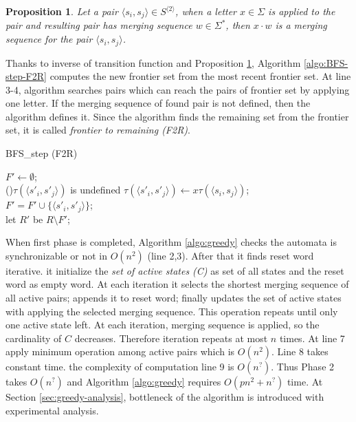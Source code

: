 \documentclass[12pt]{article}
\newtheorem{proposition}{Proposition}[section]
\begin{document}
\begin{proposition}
	\label{prop:merging}
	Let a pair $\langle s_i,s_j \rangle \in S^{\langle 2 \rangle}$, when a letter $x \in \Sigma$ is applied to the pair and resulting pair has merging sequence $w \in \Sigma^*$, then $x \cdot w$ is a merging sequence for the pair $\langle s_i,s_j \rangle$.
\end{proposition}

Thanks to inverse of transition function and Proposition \ref{prop:merging}, Algorithm \ref{algo:BFS-step-F2R} computes the new frontier set from the most recent frontier set. At line 3-4, algorithm searches pairs which can reach the pairs of frontier set by applying one letter. If the merging sequence of found pair is not defined, then the algorithm defines it. Since the algorithm finds the remaining set from the frontier set, it is called \textit{frontier to remaining (F2R)}. 

\begin{algorithm}[ht]
	\label{algo:BFS-step-F2R}
	\caption{{BFS\_step (F2R)}}
	
	
	$F' \longleftarrow \emptyset$;\\
	{
		{
			{
				\If(){$\tau(\langle s'_i,s'_j\rangle)$ is undefined}
				{
					$\tau(\langle s'_i,s'_j\rangle) \longleftarrow x \tau(\langle s_i,s_j \rangle)$;\\
					$F' = F' \cup \{ \langle s'_i,s'_j\rangle  \} $;\\
				}
			}
		}
	}
	let $R'$ be $R \setminus F'$;
\end{algorithm}

When first phase is completed, Algorithm \ref{algo:greedy} checks the automata is synchronizable or not in $O(n^2)$ (line 2,3). After that it finds reset word iterative. it initialize the \textit{set of active states (C)} as set of all states and the reset word as empty word. At each iteration it selects the shortest merging sequence of all active pairs; appends it to reset word; finally updates the set of active states with applying the selected merging sequence. This operation repeats until only one active state left. At each iteration, merging sequence is applied, so the cardinality of $C$ decreases. Therefore iteration repeats at most $n$ times. At line 7 apply minimum operation among active pairs which is $O(n^2)$. Line 8 takes constant time. the complexity of computation line 9 is $O(n^?)$. Thus Phase 2 takes $O(n^?)$ and Algorithm \ref{algo:greedy} requires $O(pn^2 + n^?)$ time. At Section \ref{sec:greedy-analysis}, bottleneck of the algorithm is introduced with experimental analysis.
\end{document}
